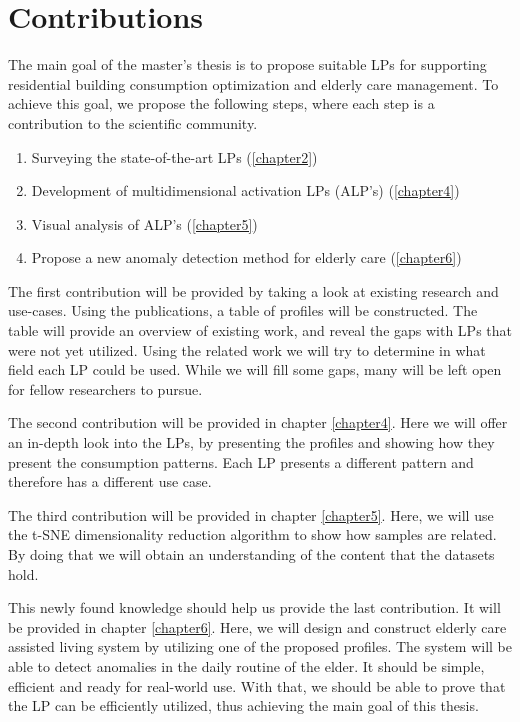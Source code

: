 \section{Contributions}
\label{sec:contributions} 

The main goal of the master's thesis is to propose suitable LPs for supporting residential building consumption optimization and elderly care management.
To achieve this goal, we propose the following steps, where each step is a contribution to the scientific community.

\begin{enumerate}
	\item Surveying the state-of-the-art LPs (\ref{chapter2})
	\item Development of multidimensional activation LPs (ALP's) (\ref{chapter4})
	\item Visual analysis of ALP's (\ref{chapter5})
	\item Propose a new anomaly detection method for elderly care (\ref{chapter6})
\end{enumerate}


The first contribution will be provided by taking a look at existing research and use-cases. 
Using the publications, a table of profiles will be constructed.
The table will provide an overview of existing work, and reveal the gaps with LPs that were not yet utilized.
Using the related work we will try to determine in what field each LP could be used. 
While we will fill some gaps, many will be left open for fellow researchers to pursue.  

The second contribution will be provided in chapter \ref{chapter4}.
Here we will offer an in-depth look into the LPs, by presenting the profiles and showing how they present the consumption patterns.
Each LP presents a different pattern and therefore has a different use case. 

The third contribution will be provided in chapter \ref{chapter5}.
Here, we will use the t-SNE dimensionality reduction algorithm to show how samples are related.
By doing that we will obtain an understanding of the content that the datasets hold.

This newly found knowledge should help us provide the last contribution.
It will be provided in chapter \ref{chapter6}.
Here, we will design and construct elderly care assisted living system by utilizing one of the proposed profiles.
The system will be able to detect anomalies in the daily routine of the elder.
It should be simple, efficient and ready for real-world use.
With that, we should be able to prove that the LP can be efficiently utilized,
thus achieving the main goal of this thesis.